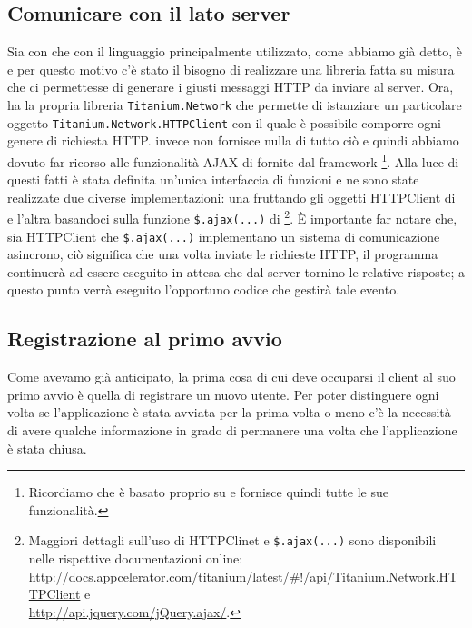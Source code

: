         \subsection{Comunicare con il lato server}
        \label{subsec:comlatoserver}
            Sia con \tisdk{} che con \pg{} il linguaggio principalmente utilizzato,
            come abbiamo già detto, è \js{} e per questo motivo c'è stato il bisogno
            di realizzare una libreria fatta su misura che ci permettesse di generare
            i giusti messaggi HTTP da inviare al server. Ora, \tisdk{} ha la propria
            libreria \texttt{Titanium.Network} che permette di istanziare un
            particolare oggetto \texttt{Titanium.Network.HTTPClient} con il
            quale è possibile comporre ogni genere di richiesta HTTP. \pg{}
            invece non fornisce nulla di tutto ciò e quindi abbiamo dovuto far
            ricorso alle funzionalità AJAX di \jq{} fornite dal framework
            \kendomob{}\footnote{Ricordiamo che \kendomob{} è basato proprio su
            \jq{} e fornisce quindi tutte le sue funzionalità.}. Alla luce di
            questi fatti è stata definita un'unica interfaccia di funzioni \js{}
            e ne sono state realizzate due diverse implementazioni: una
            fruttando gli oggetti HTTPClient di \tisdk{} e l'altra basandoci
            sulla funzione \verb|$.ajax(...)| di \jq{}\footnote{Maggiori
            dettagli sull'uso di HTTPClinet e \texttt{\$.ajax(...)} sono
            disponibili nelle rispettive documentazioni online:\\
            \url{http://docs.appcelerator.com/titanium/latest/\#!/api/Titanium.Network.HTTPClient}
            e\\ \url{http://api.jquery.com/jQuery.ajax/}.}.
            È importante far notare
            che, sia HTTPClient che \verb|$.ajax(...)| implementano un sistema
            di comunicazione asincrono, ciò significa che una volta inviate le
            richieste HTTP, il programma continuerà ad essere eseguito in attesa
            che dal server tornino le relative risposte; a questo punto verrà
            eseguito l'opportuno codice che gestirà tale evento.


        \subsection{Registrazione al primo avvio}
        \label{subsec:registrazione}
            Come avevamo già anticipato, la prima cosa di cui deve occuparsi
            il client al suo primo avvio è quella di registrare un nuovo utente. Per
            poter distinguere ogni volta se l'applicazione è stata avviata
            per la prima volta o meno c'è la
            necessità di avere qualche informazione in grado di permanere una volta
            che l'applicazione è stata chiusa.

